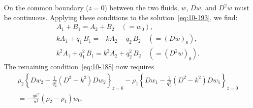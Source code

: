 On the common boundary ($z = 0$) between the two fluids, $w$, $Dw$, and $D^2w$ must be continuous. Applying these conditions to the solution~\eqref{eq:10-193}, we find:
\begin{gather}
A_1+B_1 = A_2+B_2 \quad (= w_0), \label{eq:10-195}\\
kA_1+q_1\,B_1 = -kA_2-q_2\,B_2 \quad (= (Dw)_0), \label{eq:10-196}\\
k^2A_1+q_1^2\,B_1 = k^2A_2+q_2^2\,B_2 \quad (= (D^2w)_0). \label{eq:10-197}
\end{gather}
The remaining condition~\eqref{eq:10-188} now requires
\begin{align}
\label{eq:10-198}
\rho_2\!\left\{Dw_2 - \frac{1}{q_2^2}(D^2-k^2)Dw_2\right\}_{z=0} - \rho_1\!\left\{Dw_1-\frac{1}{q_1^2}(D^2-k^2)Dw_1\right\}_{z=0} \nonumber\\
= -\frac{gk^2}{n^2}(\rho_2-\rho_1)w_0.
\end{align}

